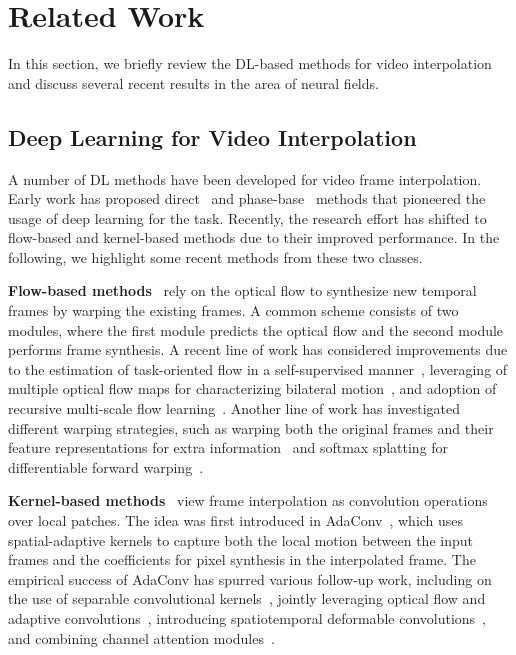 \documentclass[12pt]{article}
\begin{document}
\section{Related Work}
\label{sec:background}
In this section, we briefly review the DL-based methods for video interpolation and discuss several recent results in the area of neural fields.

\subsection{Deep Learning for Video Interpolation}
\label{sec:deeplearning}

A number of DL methods have been developed for video frame interpolation. 
Early work has proposed direct~\cite{Long.etal2016} and phase-base~\cite{Meyer.etal2018} methods that pioneered the usage of deep learning for the task. Recently, the research effort has shifted to flow-based and kernel-based methods due to their improved performance. In the following, we highlight some recent methods from these two classes.

\textbf{Flow-based methods}~\cite{Liu.etal2017video,Jiang.etal2018} rely on the optical flow to synthesize new temporal frames by warping the existing frames.
A common scheme consists of two modules, where the first module predicts the optical flow and the second module performs frame synthesis. A recent line of work has considered improvements due to the
estimation of task-oriented flow in a self-supervised manner~\cite{Xue.etal2019}, leveraging of multiple optical flow maps for characterizing bilateral motion~\cite{park2020bmbc,park2021asymmetric}, and adoption of recursive multi-scale flow learning~\cite{sim2021xvfi}.
Another line of work has investigated different warping strategies, such as warping both the original frames and their feature representations for extra information~\cite{Niklaus.etal2018} and softmax splatting for differentiable forward warping~\cite{niklaus2020softmax}.

\textbf{Kernel-based methods}~\cite{niklaus2021revisiting} view frame interpolation as convolution operations over local patches.
The idea was first introduced in AdaConv~\cite{Niklaus.etal2017a}, which uses spatial-adaptive kernels to capture both the local motion between the input frames and the coefficients for pixel synthesis in the interpolated frame.
The empirical success of AdaConv has spurred various follow-up work, including on the use of separable convolutional kernels~\cite{Niklaus.etal2017b}, jointly leveraging optical flow and adaptive convolutions~\cite{Bao.etal2021}, introducing spatiotemporal deformable convolutions~\cite{lee2020adacof,shi2021video}, and combining channel attention modules~\cite{choi2020channel}.
\end{document}
